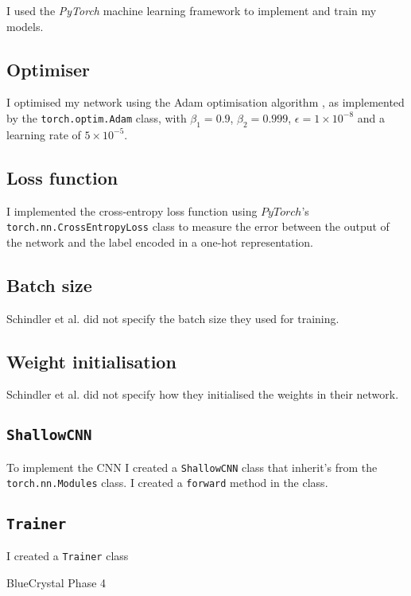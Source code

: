 \documentclass[conference]{IEEEtran}
\begin{document}
I used the \textit{PyTorch} \cite{PyTorch} machine learning framework to implement and train my models.

\subsection{Optimiser}

I optimised my network using the Adam optimisation algorithm \cite{KingmaBa}, as implemented by the \texttt{torch.optim.Adam} class, with $\beta_1=0.9$, $\beta_2=0.999$, $\epsilon=1\times10^{-8}$ and a learning rate of $5\times10^{-5}$.

\subsection{Loss function}

I implemented the cross-entropy loss function using $PyTorch$'s \texttt{torch.nn.CrossEntropyLoss} class to measure the error between the output of the network and the label encoded in a one-hot representation.

\subsection{Batch size}

Schindler et al. did not specify the batch size they used for training.

\subsection{Weight initialisation}

Schindler et al. did not specify how they initialised the weights in their network.

\subsection{\texttt{ShallowCNN}}

To implement the CNN I created a \texttt{ShallowCNN} class that inherit's from the \texttt{torch.nn.Modules} class.
I created a \texttt{forward} method in the class.

\subsection{\texttt{Trainer}}

I created a \texttt{Trainer} class 

BlueCrystal Phase 4
\end{document}
